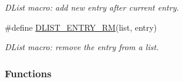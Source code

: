 \begin{DoxyCompactItemize}
\begin{DoxyCompactList}\small\item\em D\-List macro\-: add new {\ttfamily entry} after {\ttfamily current} entry. \end{DoxyCompactList}\item 
\#define \hyperlink{group__kern__impl_ga4a663d16206e95f1084af0a44e8518a0}{D\-L\-I\-S\-T\-\_\-\-E\-N\-T\-R\-Y\-\_\-\-R\-M}(list, entry)
\begin{DoxyCompactList}\small\item\em D\-List macro\-: remove the {\ttfamily entry} from a list. \end{DoxyCompactList}\end{DoxyCompactItemize}
\subsubsection*{Functions}
